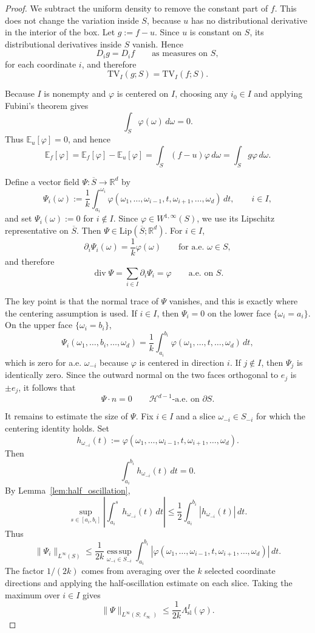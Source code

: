 \documentclass[11pt,letterpaper]{article}
\theoremstyle{definition}
\theoremstyle{remark}
\newcommand{\TV}{\mathrm{TV}}
\begin{document}
\begin{proof}
We subtract the uniform density to remove the constant part of $f$. This does
not change the variation inside $S$, because $u$ has no distributional
derivative in the interior of the box. Let $g:=f-u$. Since $u$ is constant on
$S$, its distributional derivatives inside $S$ vanish. Hence
$$
D_i g=D_i f
\qquad\text{as measures on }S,
$$
for each coordinate $i$, and therefore
$$
\TV_I(g;S)=\TV_I(f;S).
$$

Because $I$ is nonempty and $\varphi$ is centered on $I$, choosing any
$i_0\in I$ and applying Fubini's theorem gives
$$
\int_S\varphi(\omega)\,d\omega=0.
$$
Thus $\mathbb E_u[\varphi]=0$, and hence
$$
\mathbb E_f[\varphi]
=
\mathbb E_f[\varphi]-\mathbb E_u[\varphi]
=
\int_S (f-u)\varphi\,d\omega
=
\int_S g\varphi\,d\omega.
$$

Define a vector field $\Psi:\overline S\to\mathbb R^d$ by
$$
\Psi_i(\omega)
:=
\frac1k
\int_{a_i}^{\omega_i}
\varphi(\omega_1,\ldots,\omega_{i-1},t,\omega_{i+1},\ldots,\omega_d)\,dt,
\qquad i\in I,
$$
and set $\Psi_i(\omega):=0$ for $i\notin I$. Since
$\varphi\in W^{1,\infty}(S)$, we use its Lipschitz representative on
$\overline S$. Then $\Psi\in\mathrm{Lip}(\overline S;\mathbb R^d)$. For
$i\in I$,
$$
\partial_i\Psi_i(\omega)=\frac1k\varphi(\omega)
\qquad\text{for a.e. }\omega\in S,
$$
and therefore
$$
\operatorname{div}\Psi
=
\sum_{i\in I}\partial_i\Psi_i
=
\varphi
\qquad\text{a.e. on }S.
$$

The key point is that the normal trace of $\Psi$ vanishes, and this is
exactly where the centering assumption is used. If $i\in I$, then $\Psi_i=0$ on the lower
face $\{\omega_i=a_i\}$. On the upper face $\{\omega_i=b_i\}$,
$$
\Psi_i(\omega_1,\ldots,b_i,\ldots,\omega_d)
=
\frac1k
\int_{a_i}^{b_i}
\varphi(\omega_1,\ldots,t,\ldots,\omega_d)\,dt,
$$
which is zero for a.e. $\omega_{-i}$ because $\varphi$ is centered in direction
$i$. If $j\notin I$, then $\Psi_j$ is identically zero. Since the outward
normal on the two faces orthogonal to $e_j$ is $\pm e_j$, it follows that
$$
\Psi\cdot n=0
\qquad
\mathcal H^{d-1}\text{-a.e. on }\partial S.
$$

It remains to estimate the size of $\Psi$. Fix $i\in I$ and a slice
$\omega_{-i}\in S_{-i}$ for which the centering identity holds. Set
$$
h_{\omega_{-i}}(t)
:=
\varphi(\omega_1,\ldots,\omega_{i-1},t,\omega_{i+1},\ldots,\omega_d).
$$
Then
$$
\int_{a_i}^{b_i}h_{\omega_{-i}}(t)\,dt=0.
$$
By Lemma~\ref{lem:half_oscillation},
$$
\sup_{s\in[a_i,b_i]}
\left|
\int_{a_i}^{s}h_{\omega_{-i}}(t)\,dt
\right|
\le
\frac12\int_{a_i}^{b_i}|h_{\omega_{-i}}(t)|\,dt.
$$
Thus
$$
\|\Psi_i\|_{L^\infty(S)}
\le
\frac{1}{2k}
\operatorname*{ess\,sup}_{\omega_{-i}\in S_{-i}}
\int_{a_i}^{b_i}
|\varphi(\omega_1,\ldots,\omega_{i-1},t,\omega_{i+1},\ldots,\omega_d)|\,dt.
$$
The factor $1/(2k)$ comes from averaging over the $k$ selected coordinate
directions and applying the half-oscillation estimate on each slice.
Taking the maximum over $i\in I$ gives
\begin{equation}
\label{eq:vector_field_sup_bound_tv}
\|\Psi\|_{L^\infty(S;\ell_\infty)}
\le
\frac{1}{2k}
\Lambda_{\mathrm{sl}}^I(\varphi).
\end{equation}


\end{proof}
\end{document}
